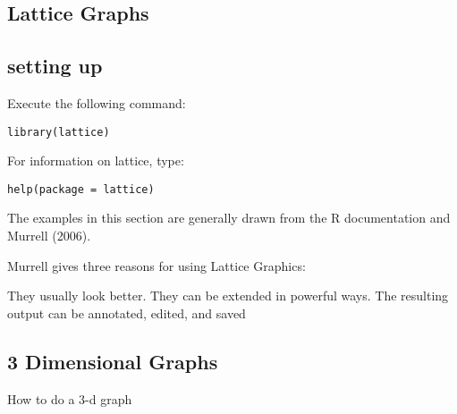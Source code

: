 \subsection{Lattice Graphs}
\subsection{setting up}
Execute the following command:
\begin{myindentpar}{1cm}
\begin{verbatim}
library(lattice)
\end{verbatim}
\end{myindentpar}
For information on lattice, type:
\begin{myindentpar}{1cm}
\begin{verbatim}
help(package = lattice)
\end{verbatim}
\end{myindentpar}
The examples in this section are generally drawn from the R documentation and Murrell (2006).

Murrell gives three reasons for using Lattice Graphics:

They usually look better.
They can be extended in powerful ways.
The resulting output can be annotated, edited, and saved

\subsection{3 Dimensional Graphs}
How to do a 3-d graph

\newpage
